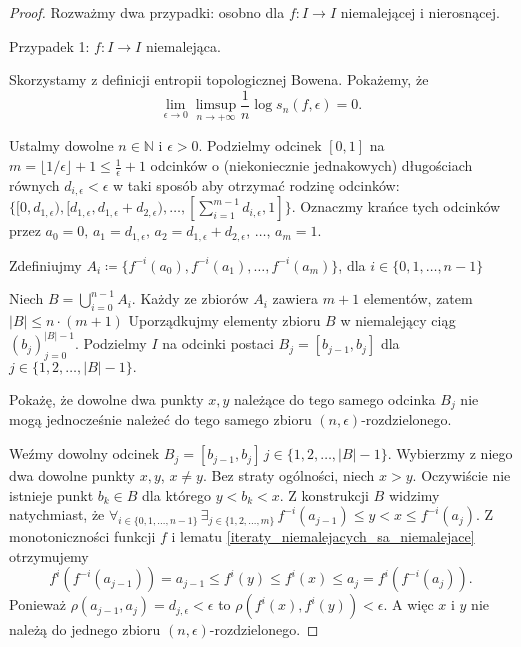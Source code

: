 \documentclass[licencjacka]{pwr_wmat_praca_dyplomowa}
\theoremstyle{plain}
\numberwithin{theorem}{chapter}
\theoremstyle{definition}
\numberwithin{theorem}{chapter}
\begin{document}
\begin{proof}
Rozważmy dwa przypadki: osobno dla $f: I \rightarrow I$ niemalejącej i nierosnącej.
\item[Przypadek 1: $f: I \rightarrow I$ niemalejąca.]

Skorzystamy z definicji entropii topologicznej Bowena. Pokażemy, że 
$$\lim_{\epsilon \rightarrow 0} \limsup_{n \rightarrow +\infty} \frac{1}{n} \log s_n(f, \epsilon) = 0.$$


Ustalmy dowolne $n \in \mathbb{N}$ i $\epsilon > 0.$ Podzielmy odcinek $[0, 1]$ na $m = \lfloor 1/\epsilon \rfloor + 1 \leq \frac{1}{\epsilon} + 1$ odcinków o (niekoniecznie jednakowych) długościach równych $d_{i,\epsilon} < \epsilon$ w taki sposób aby otrzymać rodzinę odcinków: $\{ [0, d_{1,\epsilon}), [d_{1,\epsilon}, d_{1,\epsilon} + d_{2, \epsilon}), \ldots, [\sum_{i=1}^{m-1} d_{i, \epsilon}, 1] \}.$ Oznaczmy krańce tych odcinków przez $a_0=0, \, a_1 = d_{1,\epsilon}, \, a_2 = d_{1,\epsilon} + d_{2,\epsilon}, \, \ldots, \, a_m = 1.$ 

Zdefiniujmy $A_i \coloneqq \{f^{-i}(a_0), f^{-i}(a_1), \ldots, f^{-i}(a_m)\}$, dla $i \in \{0, 1, \ldots, n-1\}$

Niech $B = \bigcup_{i=0}^{n-1} A_i.$ Każdy ze zbiorów $A_i$ zawiera $m+1$ elementów, zatem $|B| \leq n \cdot (m+1)$ Uporządkujmy elementy zbioru $B$ w niemalejący ciąg $(b_j)_{j=0}^{|B|-1}.$ Podzielmy $I$ na odcinki postaci $B_j = [b_{j-1}, b_{j}]$ dla $j \in \{1, 2, \ldots, |B|-1\}.$  

Pokażę, że dowolne dwa punkty $x, y$ należące do tego samego odcinka $B_j$ nie mogą jednocześnie należeć do tego samego zbioru $(n, \epsilon)$-rozdzielonego.

Weźmy dowolny odcinek $B_j = [b_{j-1}, b_{j}] \, j \in \{1, 2, \ldots, |B|-1\}.$ Wybierzmy z niego dwa dowolne punkty $x, y$, $x \neq y$. Bez straty ogólności, niech $x > y.$ Oczywiście nie istnieje punkt $b_k \in B$ dla którego $y < b_k < x.$ Z konstrukcji $B$ widzimy natychmiast, że $\forall_{i \in \{0, 1, \ldots, n-1\}} \, \exists_{j \in \{1,2,\ldots,m\}} \, f^{-i}(a_{j-1}) \leq y < x \leq f^{-i}(a_j)$. Z monotoniczności funkcji $f$ i lematu \ref{iteraty_niemalejacych_sa_niemalejace} otrzymujemy 
$$f^i(f^{-i}(a_{j-1})) =  a_{j-1} \leq f^i(y) \leq f^i(x) \leq a_j = f^i(f^{-i}(a_j)).$$
Ponieważ $\rho(a_{j-1}, a_j) = d_{j,\epsilon} < \epsilon$ to  $\rho(f^i(x), f^i(y)) < \epsilon.$ A więc $x$ i $y$ nie należą do jednego zbioru $(n, \epsilon)$-rozdzielonego.




\end{proof}
\end{document}
